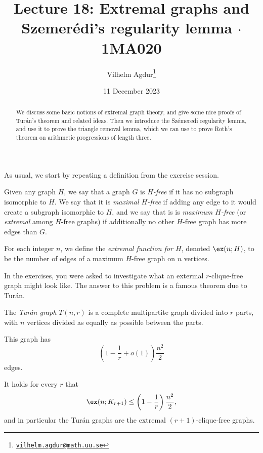 \documentclass[nobib]{tufte-handout}
\title{Lecture 18: Extremal graphs and Szemerédi's regularity lemma $\cdot$ 1MA020}
\author[Vilhelm Agdur]{Vilhelm Agdur\thanks{\href{mailto:vilhelm.agdur@math.uu.se}{\nolinkurl{vilhelm.agdur@math.uu.se}}}}
\date{11 December 2023}
\begin{document}
\maketitle%

\begin{abstract}
\noindent
We discuss some basic notions of extremal graph theory, and give some nice proofs of Turán's theorem and related ideas. Then we introduce the Szémeredi regularity lemma, and use it to prove the triangle removal lemma, which we can use to prove Roth's theorem on arithmetic progressions of length three.
\end{abstract}

As usual, we start by repeating a definition from the exercise session.

\begin{definition}
    Given any graph $H$, we say that a graph $G$ is \emph{$H$-free} if it has no subgraph isomorphic to $H$. We say that it is \emph{maximal $H$-free} if adding any edge to it would create a subgraph isomorphic to $H$, and we say that is is \emph{maximum $H$-free} (or \emph{extremal} among $H$-free graphs) if additionally no other $H$-free graph has more edges than $G$.
  
    For each integer $n$, we define the \emph{extremal function for $H$}, denoted $\ex(n; H)$, to be the number of edges of a maximum $H$-free graph on $n$ vertices.
\end{definition}

In the exercises, you were asked to investigate what an extermal $r$-clique-free graph might look like. The answer to this problem is a famous theorem due to Turán.

\begin{definition}
    The \emph{Turán graph} $T(n,r)$ is a complete multipartite graph divided into $r$ parts, with $n$ vertices divided as equally as possible between the parts.

    This graph has
    $$\left(1 - \frac{1}{r} + o(1)\right)\frac{n^2}{2}$$
    edges.
\end{definition}

\begin{theorem}[Turán, 1941]\label{thm:turan}
    It holds for every $r$ that
    $$\ex(n; K_{r+1}) \leq \left(1 - \frac{1}{r}\right)\frac{n^2}{2},$$
    and in particular the Turán graphs are the extremal $(r+1)$-clique-free graphs.
\end{theorem}
\end{document}
